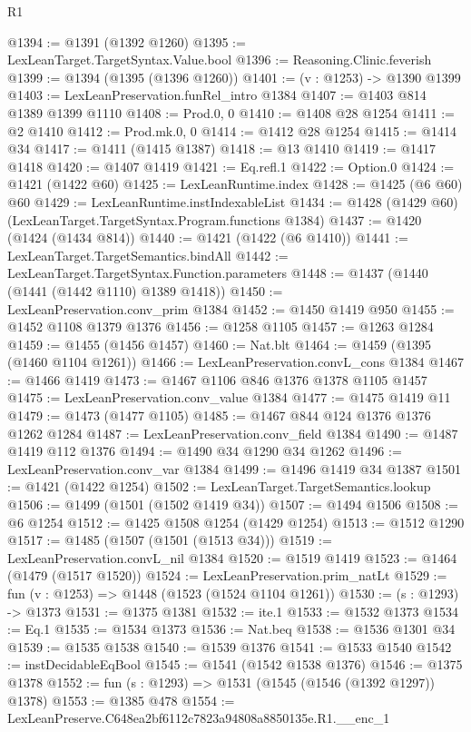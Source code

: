 \begin{lexlean}{R1}
\begin{coremodule}
@1394 := @1391 (@1392 @1260)
@1395 := LexLeanTarget.TargetSyntax.Value.bool
@1396 := Reasoning.Clinic.feverish
@1399 := @1394 (@1395 (@1396 @1260))
@1401 := (v : @1253) -> @1390 @1399
@1403 := LexLeanPreservation.funRel_intro @1384
@1407 := @1403 @814 @1389 @1399 @1110
@1408 := Prod.{0, 0}
@1410 := @1408 @28 @1254
@1411 := @2 @1410
@1412 := Prod.mk.{0, 0}
@1414 := @1412 @28 @1254
@1415 := @1414 @34
@1417 := @1411 (@1415 @1387)
@1418 := @13 @1410
@1419 := @1417 @1418
@1420 := @1407 @1419
@1421 := Eq.refl.{1}
@1422 := Option.{0}
@1424 := @1421 (@1422 @60)
@1425 := LexLeanRuntime.index
@1428 := @1425 (@6 @60) @60
@1429 := LexLeanRuntime.instIndexableList
@1434 := @1428 (@1429 @60) (LexLeanTarget.TargetSyntax.Program.functions @1384)
@1437 := @1420 (@1424 (@1434 @814))
@1440 := @1421 (@1422 (@6 @1410))
@1441 := LexLeanTarget.TargetSemantics.bindAll
@1442 := LexLeanTarget.TargetSyntax.Function.parameters
@1448 := @1437 (@1440 (@1441 (@1442 @1110) @1389 @1418))
@1450 := LexLeanPreservation.conv_prim @1384
@1452 := @1450 @1419 @950
@1455 := @1452 @1108 @1379 @1376
@1456 := @1258 @1105
@1457 := @1263 @1284
@1459 := @1455 (@1456 @1457)
@1460 := Nat.blt
@1464 := @1459 (@1395 (@1460 @1104 @1261))
@1466 := LexLeanPreservation.convL_cons @1384
@1467 := @1466 @1419
@1473 := @1467 @1106 @846 @1376 @1378 @1105 @1457
@1475 := LexLeanPreservation.conv_value @1384
@1477 := @1475 @1419 @11
@1479 := @1473 (@1477 @1105)
@1485 := @1467 @844 @124 @1376 @1376 @1262 @1284
@1487 := LexLeanPreservation.conv_field @1384
@1490 := @1487 @1419 @112 @1376
@1494 := @1490 @34 @1290 @34 @1262
@1496 := LexLeanPreservation.conv_var @1384
@1499 := @1496 @1419 @34 @1387
@1501 := @1421 (@1422 @1254)
@1502 := LexLeanTarget.TargetSemantics.lookup
@1506 := @1499 (@1501 (@1502 @1419 @34))
@1507 := @1494 @1506
@1508 := @6 @1254
@1512 := @1425 @1508 @1254 (@1429 @1254)
@1513 := @1512 @1290
@1517 := @1485 (@1507 (@1501 (@1513 @34)))
@1519 := LexLeanPreservation.convL_nil @1384
@1520 := @1519 @1419
@1523 := @1464 (@1479 (@1517 @1520))
@1524 := LexLeanPreservation.prim_natLt
@1529 := fun (v : @1253) => @1448 (@1523 (@1524 @1104 @1261))
@1530 := (s : @1293) -> @1373
@1531 := @1375 @1381
@1532 := ite.{1}
@1533 := @1532 @1373
@1534 := Eq.{1}
@1535 := @1534 @1373
@1536 := Nat.beq
@1538 := @1536 @1301 @34
@1539 := @1535 @1538
@1540 := @1539 @1376
@1541 := @1533 @1540
@1542 := instDecidableEqBool
@1545 := @1541 (@1542 @1538 @1376)
@1546 := @1375 @1378
@1552 := fun (s : @1293) => @1531 (@1545 (@1546 (@1392 @1297)) @1378)
@1553 := @1385 @478
@1554 := LexLeanPreserve.C648ea2bf6112c7823a94808a8850135e.R1.__enc_1

\end{coremodule}
\end{lexlean}

